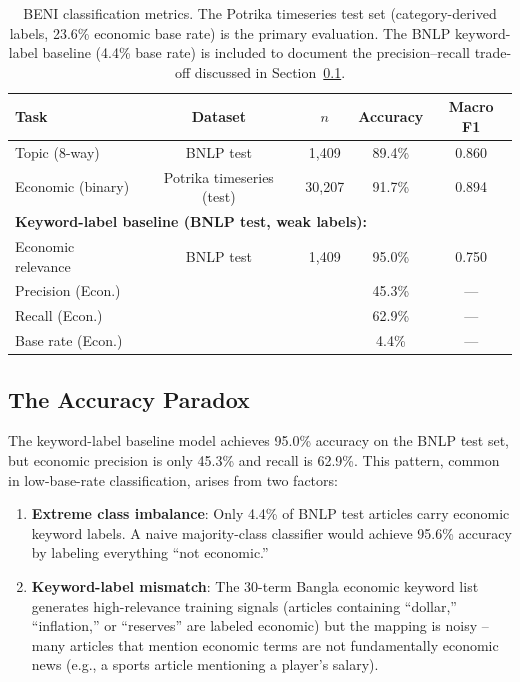 \documentclass[11pt]{article}
\begin{document}
\begin{table}[h]
\centering
\begin{tabular}{lcccc}
\toprule
Task & Dataset & \(n\) & Accuracy & Macro F1 \\
\midrule
Topic (8-way)       & BNLP test \citep{BNLP2022} & 1,409 & 89.4\%  & 0.860 \\
Economic (binary)   & Potrika timeseries (test)  & 30,207 & 91.7\%  & 0.894 \\
\midrule
\multicolumn{5}{l}{\textbf{Keyword-label baseline (BNLP test, weak labels):}} \\
Economic relevance  & BNLP test \citep{BNLP2022} & 1,409 & 95.0\%  & 0.750 \\
\hspace{1em}Precision (Econ.) & & & 45.3\% & --- \\
\hspace{1em}Recall (Econ.)    & & & 62.9\% & --- \\
\hspace{1em}Base rate (Econ.) & & & 4.4\%  & --- \\
\bottomrule
\end{tabular}
\caption{BENI classification metrics. The Potrika timeseries test set (category-derived labels, 23.6\% economic base rate) is the primary evaluation. The BNLP keyword-label baseline (4.4\% base rate) is included to document the precision--recall trade-off discussed in Section~\ref{sec:accuracy-paradox}.}
\end{table}

\subsection{The Accuracy Paradox}\label{sec:accuracy-paradox}

The keyword-label baseline model achieves 95.0\% accuracy on the BNLP test set, but economic precision is only 45.3\% and recall is 62.9\%. This pattern, common in low-base-rate classification, arises from two factors:

\begin{enumerate}
\item \textbf{Extreme class imbalance}: Only 4.4\% of BNLP test articles carry economic keyword labels. A naive majority-class classifier would achieve 95.6\% accuracy by labeling everything ``not economic.''
\item \textbf{Keyword-label mismatch}: The 30-term Bangla economic keyword list generates high-relevance training signals (articles containing ``dollar,'' ``inflation,'' or ``reserves'' are labeled economic) but the mapping is noisy -- many articles that mention economic terms are not fundamentally economic news (e.g., a sports article mentioning a player's salary).
\end{enumerate}
\end{document}

